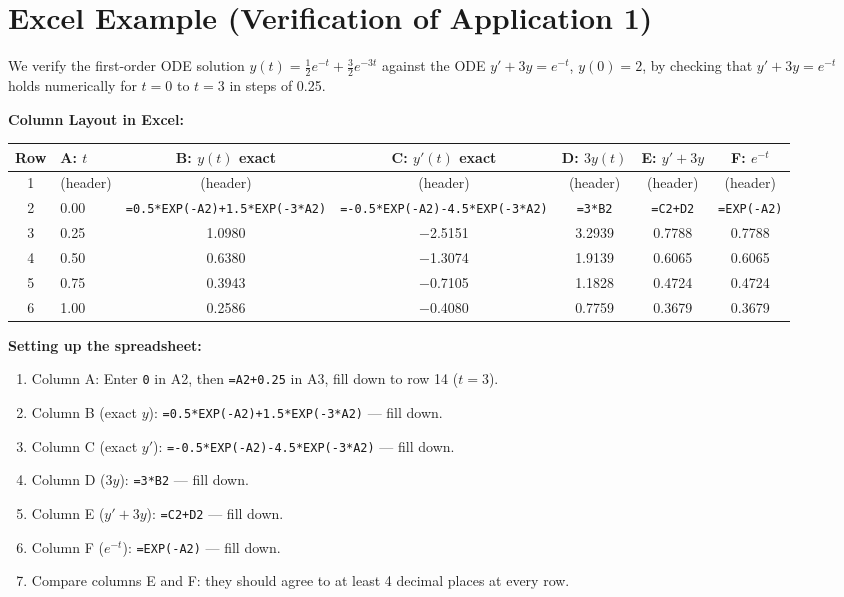 \documentclass[12pt,a4paper]{article}
\begin{document}
\section{Excel Example (Verification of Application 1)}

We verify the first-order ODE solution $y(t) = \tfrac{1}{2}e^{-t} + \tfrac{3}{2}e^{-3t}$
against the ODE $y' + 3y = e^{-t}$, $y(0)=2$, by checking that $y'+3y = e^{-t}$ holds
numerically for $t = 0$ to $t = 3$ in steps of 0.25.

\medskip
\textbf{Column Layout in Excel:}

\begin{center}
\begin{tabular}{@{}clccccc@{}}
\toprule
\textbf{Row} & \textbf{A: }$t$ & \textbf{B: }$y(t)$ exact & \textbf{C: }$y'(t)$ exact
& \textbf{D: }$3y(t)$ & \textbf{E: }$y'+3y$ & \textbf{F: }$e^{-t}$ \\
\midrule
1 & (header) & (header) & (header) & (header) & (header) & (header) \\
2 & 0.00
  & \texttt{=0.5*EXP(-A2)+1.5*EXP(-3*A2)}
  & \texttt{=-0.5*EXP(-A2)-4.5*EXP(-3*A2)}
  & \texttt{=3*B2}
  & \texttt{=C2+D2}
  & \texttt{=EXP(-A2)} \\
3 & 0.25 & 1.0980 & $-$2.5151 & 3.2939 & 0.7788 & 0.7788 \\
4 & 0.50 & 0.6380 & $-$1.3074 & 1.9139 & 0.6065 & 0.6065 \\
5 & 0.75 & 0.3943 & $-$0.7105 & 1.1828 & 0.4724 & 0.4724 \\
6 & 1.00 & 0.2586 & $-$0.4080 & 0.7759 & 0.3679 & 0.3679 \\
\bottomrule
\end{tabular}
\end{center}

\medskip
\textbf{Setting up the spreadsheet:}
\begin{enumerate}[nosep]
  \item Column A: Enter \texttt{0} in A2, then \texttt{=A2+0.25} in A3, fill down to row 14 ($t=3$).
  \item Column B (exact $y$): \texttt{=0.5*EXP(-A2)+1.5*EXP(-3*A2)} --- fill down.
  \item Column C (exact $y'$): \texttt{=-0.5*EXP(-A2)-4.5*EXP(-3*A2)} --- fill down.
  \item Column D ($3y$): \texttt{=3*B2} --- fill down.
  \item Column E ($y'+3y$): \texttt{=C2+D2} --- fill down.
  \item Column F ($e^{-t}$): \texttt{=EXP(-A2)} --- fill down.
  \item Compare columns E and F: they should agree to at least 4 decimal places at every row.
\end{enumerate}
\end{document}
